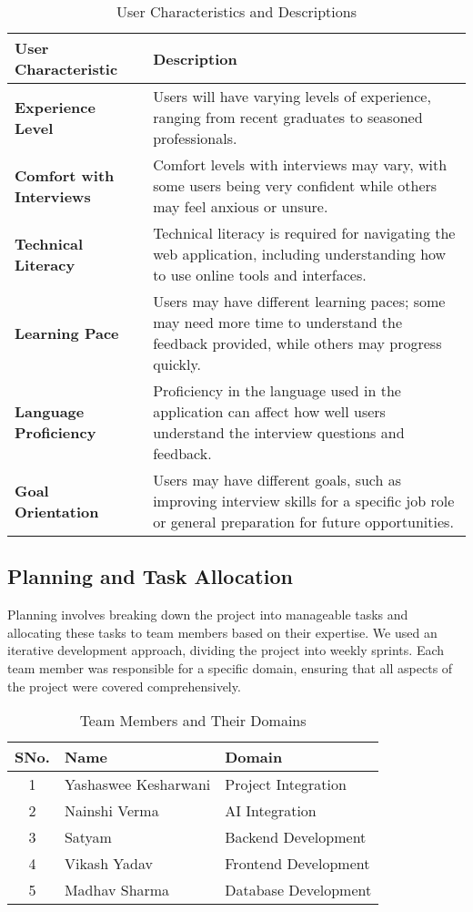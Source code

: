 \begin{table}[h!]
\centering
\begin{tabular}{|l|p{10cm}|}
\hline
\textbf{User Characteristic} & \textbf{Description} \\ \hline
\textbf{Experience Level} & Users will have varying levels of experience, ranging from recent graduates to seasoned professionals. \\ \hline
\textbf{Comfort with Interviews} & Comfort levels with interviews may vary, with some users being very confident while others may feel anxious or unsure. \\ \hline
\textbf{Technical Literacy} & Technical literacy is required for navigating the web application, including understanding how to use online tools and interfaces. \\ \hline
\textbf{Learning Pace} & Users may have different learning paces; some may need more time to understand the feedback provided, while others may progress quickly. \\ \hline
\textbf{Language Proficiency} & Proficiency in the language used in the application can affect how well users understand the interview questions and feedback. \\ \hline
\textbf{Goal Orientation} & Users may have different goals, such as improving interview skills for a specific job role or general preparation for future opportunities. \\ \hline
\end{tabular}
\caption{User Characteristics and Descriptions}
\label{table:user_characteristics}
\end{table}


\subsection{Planning and Task Allocation}
Planning involves breaking down the project into manageable tasks and allocating these tasks to team members based on their expertise. We used an iterative development approach, dividing the project into weekly sprints. Each team member was responsible for a specific domain, ensuring that all aspects of the project were covered comprehensively.

\begin{table}[h!]
\centering
\begin{tabular}{|c|l|l|}
\hline
\textbf{SNo.} & \textbf{Name}           & \textbf{Domain}            \\ \hline
1             & Yashaswee Kesharwani    & Project Integration        \\ \hline
2             & Nainshi Verma           & AI Integration             \\ \hline
3             & Satyam                  & Backend Development        \\ \hline
4             & Vikash Yadav            & Frontend Development       \\ \hline
5             & Madhav Sharma           & Database Development       \\ \hline
\end{tabular}
\caption{Team Members and Their Domains}
\end{table}


